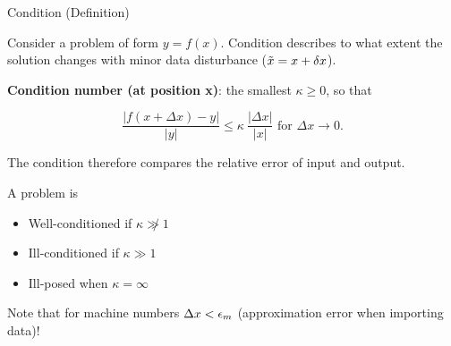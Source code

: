 \documentclass[11pt,compress,t,notes=noshow, xcolor=table]{beamer}
\begin{document}
\begin{vbframe}{Condition (Definition)}

Consider a problem of form $y = f(x)$. Condition describes to what extent the solution changes with minor data disturbance ($\tilde x = x + \delta x$).

\lz

\textbf{Condition number (at position x)}: the smallest $\kappa \geq 0$, so that

$$
\frac{|f(x+\Delta x)-y|}{|y|} \leq \kappa \ \frac{|\Delta x|}{|x|} \text{ for } \Delta x \to 0.
$$

The condition therefore compares the relative error of input and output.

A problem is

\begin{itemize}
\item Well-conditioned if $\kappa \not \gg 1$
\item Ill-conditioned if $\kappa \gg 1$
\item Ill-posed when $\kappa = \infty$
\end{itemize}

\begin{footnotesize}
Note that for machine numbers $\Delta x < \epsilon_m$ (approximation error when importing data)!
\end{footnotesize}


\end{vbframe}
\end{document}
